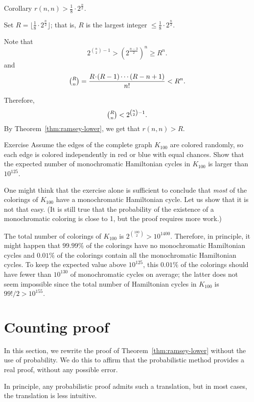 \begin{thm}{Corollary}\label{cor:2^n/2}
$r(n, n)> \tfrac1{8}\cdot 2^{\frac{n}{2}}$.
\end{thm}

Set $R=\lfloor\tfrac1{8}\cdot 2^{\frac{n}{2}}\rfloor$;
that is, $R$ is the largest integer $\le\tfrac1{8}\cdot 2^{\frac{n}{2}}$.

Note that 
\[2^{\binom n 2 - 1}> (2^{\frac{n-3}2})^n\ge R^n.\]
and
\[\tbinom R n=\frac{R\cdot(R-1)\cdots (R-n+1)}{n!}<  R^n.\]

Therefore,  
\[\tbinom R n<2^{\binom n 2 - 1}.\]
By Theorem~\ref{thm:ramsey-lower}, we get that $r(n,n)> R$.
\qeds

\begin{thm}{Exercise}\label{ex:number(ham-cycles)}
Assume the edges of the complete graph $K_{100}$ are colored randomly,
so each edge is colored independently in red or blue with equal chances. 
Show that the expected number of monochromatic Hamiltonian cycles in $K_{100}$ is larger than $10^{125}$.
\end{thm} 

One might think that the exercise alone is sufficient to conclude that \textit{most} of the colorings of $K_{100}$ have a monochromatic Hamiltonian cycle.
Let us show that it is not that easy.
(It is still true that the probability of the existence of a monochromatic coloring is close to 1, but the proof requires more work.)

The total number of colorings of $K_{100}$ is $2^{\binom{100}2}>10^{1400}$.
Therefore, in principle, it might happen that $99.99\%$ of the colorings have no monochromatic Hamiltonian cycles and $0.01\%$ of the colorings contain all the monochromatic Hamiltonian cycles.
To keep the expected value above $10^{125}$,
this $0.01\%$ of the colorings should have fewer than $10^{130}$ of monochromatic cycles on average;
the latter does not seem impossible since the total number of Hamiltonian cycles in $K_{100}$ is $99!/2>10^{155}$.

\section{Counting proof}

In this section, we rewrite the proof of Theorem~\ref{thm:ramsey-lower} without the use of probability.
We do this to affirm that the probabilistic method provides a real proof, without any possible error.

In principle,  any probabilistic proof admits such a translation,
but in most cases, the translation is less intuitive. 

